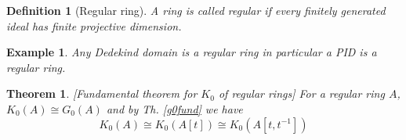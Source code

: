 \documentclass[12pt]{article}
\numberwithin{equation}{section}
\newcounter{dummy} \numberwithin{dummy}{section}
\newtheorem{theorem}[dummy]{Theorem}
\newtheorem{definition}[dummy]{Definition}
\newtheorem{example}[dummy]{Example}
\begin{document}
%		
%		
	
	
	\begin{definition}[Regular ring] A ring is called regular if every finitely generated ideal has finite projective dimension.
	\end{definition}
	\begin{example}
		Any Dedekind domain is a regular ring in particular a PID is a regular ring.
	\end{example}

	\begin{theorem}\label{extensionk0iscong}[Fundamental theorem for $K_0$ of regular rings]
		For a regular ring $A$, $K_0(A)\cong G_0(A)$ and by Th. \ref{g0fund} we have \[ K_0(A) \cong K_0(A[t]) \cong K_0(A[t,t^{-1}]) \]
	\end{theorem}

	
%	
%		
	
\end{document}
